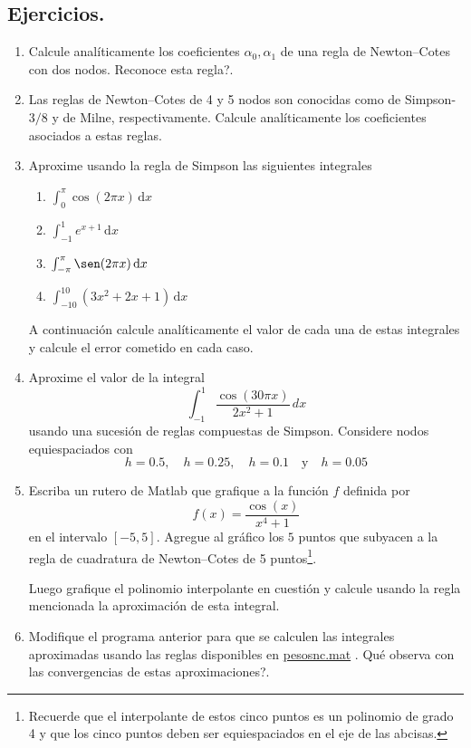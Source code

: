 \documentclass[letterpaper,11pt]{article}
\newcommand{\matlab}{{\sc Matlab} }
\begin{document}
\subsection{Ejercicios.}
\begin{enumerate}
\item 
Calcule anal\'iticamente los coeficientes $\alpha_0,\alpha_1$ de una regla de Newton--Cotes con dos nodos. \textquestiondown Reconoce esta regla?.

\item
Las reglas de Newton--Cotes de 4 y 5 nodos son conocidas como de Simpson-$3/8$ y de Milne, respectivamente.
Calcule anal\'iticamente los coeficientes asociados a estas reglas.

\item Aproxime usando la regla de Simpson las siguientes integrales
\begin{multicols}{2}
\begin{enumerate}
\item $\int_0^\pi \cos(2\pi x)\,\mathrm{d}x$
\item $\int_{-1}^1 e^{x+1}\,\mathrm{d}x$
\item $\int_{-\pi}^\pi \sen(2\pi x)\,\mathrm{d}x$
\item $\int_{-10}^{10} (3x^2+2x+1)\,\mathrm{d}x$
\end{enumerate}
\end{multicols}
A continuaci\'on calcule anal\'iticamente el valor de cada una de estas integrales y calcule el error cometido en cada caso.

\item Aproxime el valor de la integral
$$
\int_{-1}^1 \frac{\cos(30\pi x)}{2x^2+1}\, dx
$$
usando una sucesi\'on de reglas compuestas de Simpson. Considere nodos equiespaciados con
$$
h=0.5, \quad h=0.25,\quad h=0.1 \quad\text{y}\quad h=0.05
$$
\item Escriba un rutero de \matlab que grafique a la funci\'on $f$ definida por
$$
f(x)=\frac{\cos(x)}{x^4+1}
$$
en el intervalo $[-5,5]$. Agregue al gr\'afico los $5$ puntos que subyacen a la regla de cuadratura de Newton--Cotes de 5 puntos\footnote{Recuerde que el interpolante de estos cinco puntos es un polinomio de grado 4 y que los cinco puntos deben ser equiespaciados en el eje de las abcisas.}.

Luego grafique el polinomio interpolante en cuesti\'on y calcule usando la regla mencionada la aproximaci\'on de esta integral.

\item Modifique el programa anterior para que se calculen las integrales aproximadas usando las reglas disponibles en
 \href{ftp://ftp.ing-mat.udec.cl/pub/ing-mat/asignaturas/521230/ejercicios/2018-1/pesosnc.mat}{pesosnc.mat} . 
\textquestiondown Qu\'e observa con las convergencias de estas aproximaciones?.
\end{enumerate}
\end{document}
